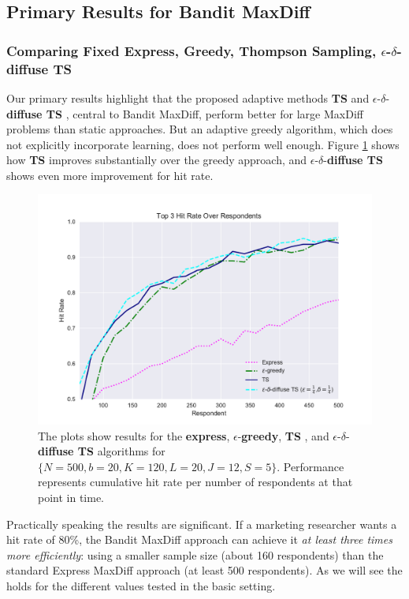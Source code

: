 \documentclass[nonblindrev]{informs3}
\newcommand{\fixedexpress}{\textbf{express}}
\newcommand{\egreedy}{$\epsilon$-\textbf{greedy}}
\newcommand{\ts}{\textbf{TS} }
\newcommand{\edts}{$\epsilon$-$\delta$-\textbf{diffuse TS} }
\newcommand{\numperset}{L}
\begin{document}
\subsection{Primary Results for Bandit MaxDiff}

\subsubsection{Comparing Fixed Express, Greedy, Thompson Sampling, \edts}

Our primary results highlight that the proposed adaptive methods \ts and \edts, central to Bandit MaxDiff, perform better for large MaxDiff problems than static approaches. But an adaptive greedy algorithm, which does not explicitly incorporate learning, does not perform well enough. Figure \ref{fig:simple_result} shows how \ts improves substantially over the greedy approach, and \edts shows even more improvement for hit rate.

\begin{figure}
\caption{The plots show results for the \fixedexpress, \egreedy, \ts, and \edts algorithms for $\{N=500,b=20,K=120,\numperset=20,J=12,S=5\}$. Performance represents cumulative hit rate per number of respondents at that point in time.}
\label{fig:simple_result}
\begin{center}
	\includegraphics[width=.8\textwidth]{plots/hr120v20k3.pdf}
\end{center}
\end{figure}


Practically speaking the results are significant. If a marketing researcher wants a hit rate of 80\%, the Bandit MaxDiff approach can achieve it \emph{at least three times more efficiently}: using a smaller sample size (about 160 respondents) than the standard Express MaxDiff approach (at least 500 respondents). As we will see the  holds for the different values tested in the basic setting.
 
\end{document}
